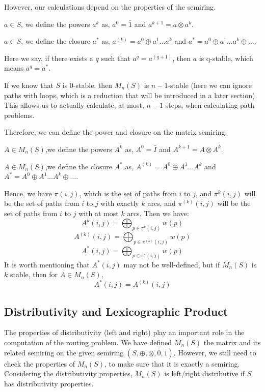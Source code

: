 \documentclass[a4paper,12pt,twoside,openright]{report}
\begin{document}
However, our calculations depend on the properties of the semiring.

$a\in S$, we define the powers $a^k$ as, $a^0 = \bar{1}$ and $a^{k+1} = a \otimes a^k$.

$a\in S$, we define the closure $a^*$ as, $a^{(k)} = a^0 \oplus a^1 \dots  a^k$ and $a^* = a^0 \oplus a^1 \dots  a^k \oplus \dots$.

Here we say, if there exists a $q$ such that $a^{q} = a^{(q+1)}$, then $a$ is q-stable, which means $a^{q} = a^*$.

If we know that $S$ is 0-stable, then $M_n(S)$ is $n-1$-stable \cite{griffin_2017} (here we can ignore paths with loops, which is a reduction that will be introduced in a later section). 
This allows us to actually calculate, at most, $n-1$ steps, when calculating path problems.

Therefore, we can define the power and closure on the matrix semiring:

$A\in M_n(S)$,we define the powers $A^k$ as, $A^0 = \bar{I}$ and $A^{k+1} = A \otimes A^k$.

$A\in M_n(S)$,we define the closure $A^*$ as, $A^{(k)} = A^0 \oplus A^1 \dots  A^k$ and $A^* = A^0 \oplus A^1 \dots  A^k \oplus \dots$.


Hence, we have $\pi(i,j)$, which is the set of paths from $i$ to $j$, and $\pi^k(i,j)$ will be the set of paths from $i$ to $j$ with exactly $k$ arcs, and $\pi^{(k)}(i,j)$ will be the set of paths from $i$ to $j$ with at most $k$ arcs. Then we have:
\[A^k(i,j) = \bigoplus_{p \in \pi^k (i,j)}w(p)\]
\[A^{(k)}(i,j) = \bigoplus_{p \in \pi^{(k)} (i,j)}w(p)\]
\[A^*(i,j) = \bigoplus_{p \in \pi^* (i,j)}w(p)\]
It is worth mentioning that $A^*(i,j)$ may not be well-defined, but if $M_n(S)$ is $k$ stable, then for $A\in M_n(S)$, \[A^*(i,j) = A^{(k)}(i,j)\]

\subsection{Distributivity and Lexicographic Product}
The properties of distributivity (left and right) play an important role in the computation of the routing problem.
We have defined $M_n(S)$ the matrix and its related semiring on the given semiring $(S,\oplus,\otimes,\bar0,\bar1)$.
However, we still need to check the properties of $M_n(S)$, to make sure that it is exactly a semiring.
Considering the distributivity properties, $M_n(S)$ is left/right distributive if $S$ has distributivity properties.
\end{document}
